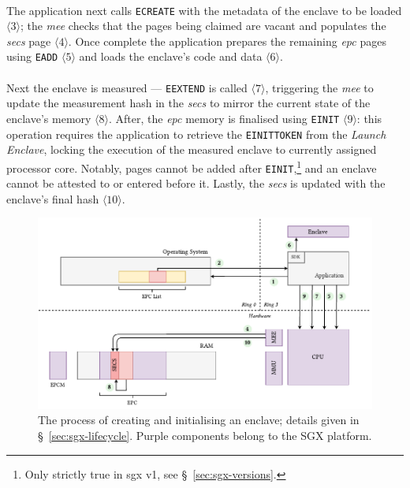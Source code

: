 \paragraph{} The application next calls \texttt{ECREATE} with the metadata of the enclave to be loaded $\langle 3 \rangle$; the \textit{\acrshort{mee}} checks that the pages being claimed are vacant and populates the \textit{\acrshort{secs}} page $\langle 4 \rangle$. Once complete the application prepares the remaining \textit{\acrshort{epc}} pages using \texttt{EADD} $\langle 5 \rangle$ and loads the enclave's code and data $\langle 6 \rangle$.

\paragraph{} Next the enclave is measured --- \texttt{EEXTEND} is called $\langle 7 \rangle$, triggering the \textit{\acrshort{mee}} to update the measurement hash in the \textit{\acrshort{secs}} to mirror the current state of the enclave's memory $\langle 8 \rangle$. After, the \textit{\acrshort{epc}} memory is finalised using \texttt{EINIT} $\langle 9 \rangle$: this operation requires the application to retrieve the \texttt{EINITTOKEN} from the \textit{Launch Enclave}, locking the execution of the measured enclave to currently assigned processor core. Notably, pages cannot be added after \texttt{EINIT},\footnote{Only strictly true in \acrshort{sgx} v1, see §~\ref{sec:sgx-versions}.} and an enclave cannot be attested to or entered before it. Lastly, the \textit{\acrshort{secs}} is updated with the enclave's final hash $\langle 10 \rangle$.


\begin{figure}[]
    \centering
    \includegraphics[width=\linewidth]{figures/SGX-EnclaveCreate.pdf}
    \captionsetup{justification=centering}
    \caption[The process of creating and initialising an enclave.]{The process of creating and initialising an enclave; details given in §~\ref{sec:sgx-lifecycle}. Purple components belong to the SGX platform.}
    \label{fig:sgx-enclavecreate}
\end{figure}


